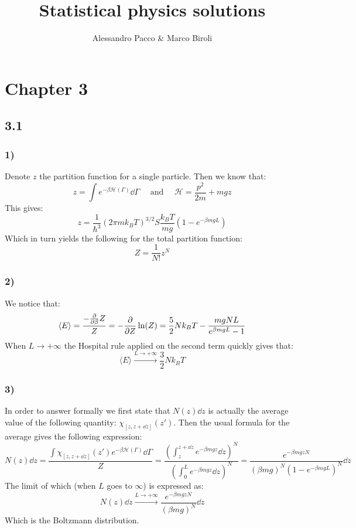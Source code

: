 \documentclass[10pt,a4paper]{book}
\author{Alessandro Pacco \& Marco Biroli}
\title{Statistical physics solutions}
\begin{document}
 
\maketitle

\chapter*{Chapter 3}
\section*{3.1}
\subsection*{1)}
Denote $z$ the partition function for a single particle. Then we know that:
\[
z = \int e^{-\beta \mathcal{H}(\Gamma) } \dd \Gamma \quad \text{ and } \quad \mathcal{H} = \frac{p^2}{2m} + mgz
\]
This gives:
\[
z = \frac{1}{\hbar^3} (2 \pi m k_B T)^{3/2} S \frac{k_B T}{m g} ( 1 - e^{-\beta m g L})
\]
Which in turn yields the following for the total partition function:
\[
Z = \frac{1}{N!} z^N 
\]
\subsection*{2)}
We notice that:
\[
\langle E \rangle = \frac{- \pdv{}{\beta} Z}{Z} = - \pdv{}{Z} \ln(Z) = \frac{5}{2} N k_B T - \frac{mg N  L}{e^{\beta m g L} - 1}
\]
When $L \to +\infty$ the Hospital rule applied on the second term quickly gives that:
\[
\langle E \rangle \stackrel{L \to +\infty}{\longrightarrow} \frac{3}{2} N k_B T
\]

\subsection*{3)}
In order to answer formally we first state that $N(z) \dd z$ is actually the average value of the following quantity: $\chi_{[z, z + \dd z]} (z')$. Then the usual formula for the average gives the following expression:
\[
N(z) \dd z = \frac{\int \chi_{[z, z + \dd z]} (z') e^{-\beta \mathcal{H}(\Gamma)} \dd \Gamma}{Z} = \frac{\left(\int_z^{z + \dd z} e^{-\beta m g z} \dd z\right)^N}{\left(\int_0^L e^{-\beta m g z} \dd z\right)^N} = \frac{e^{-\beta m g z N}}{(\beta m g)^N (1 - e^{-\beta m g L})^N} \dd z
\]
The limit of which (when $L$ goes to $\infty$) is expressed as:
\[
N(z) \dd z \stackrel{L \to +\infty}{\longrightarrow} \frac{e^{-\beta mg zN}}{(\beta m g)^N} \dd z
\]
Which is the Boltzmann distribution.
\end{document}
